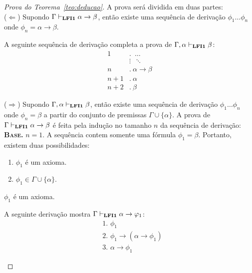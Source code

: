     \begin{proof}[Prova do Teorema~\ref{teo:deducao}] A prova será dividida em duas partes:\\
        ($\Longleftarrow$) Supondo $\Gamma \vdash_{{\normalfont\textbf{LFI1}}{}} \alpha \to \beta$, então existe uma sequência de derivação $\phi_{1} \ldots \phi_{n}$ onde $\phi_{n} = \alpha \to \beta$. 
        
        A seguinte sequência de derivação completa a prova de $\Gamma, \alpha \vdash_{{\normalfont\textbf{LFI1}}{}} \beta$:
        \begin{align*}
            \text{1}&.~ \; \ldots\\
            & \vdots \; ~\ddots\\
            \text{$n$}&.~ \alpha \to \beta\tag{Suposição}\\
            \text{$n + 1$}&.~ \alpha\tag{Premissa}\\
            \text{$n + 2$}&.~ \beta\tag{MP $n, n + 1$}
        \end{align*}

        \noindent  ($\Longrightarrow$) Supondo $\Gamma, \alpha \vdash_{{\normalfont\textbf{LFI1}}{}} \beta$, então existe uma sequência de derivação $\phi_{1} \ldots \phi_{n}$ onde $\phi_{n} = \beta$ a partir do conjunto de premissas $\Gamma \cup \{\alpha\}$. A prova de $\Gamma \vdash_{{\normalfont\textbf{LFI1}}{}} \alpha \to \beta$ é feita pela indução no tamanho $n$ da sequência de derivação:\\

        \noindent \textbf{\textsc{Base.}} $n = 1$.
        A sequência contem somente uma fórmula $\phi_{1} = \beta$. Portanto, existem duas possibilidades:
        \begin{enumerate}
            \item $\phi_{1}$ é um axioma.
            \item $\phi_{1} \in \Gamma \cup \{\alpha\}$.
        \end{enumerate}

        \begin{provaporcasos}
            \casodeprova{} $\phi_{1}$ é um axioma. 
            
                A seguinte derivação mostra $\Gamma \vdash_{{\normalfont\textbf{LFI1}}{}} \alpha \to \varphi_{1}$:
                \begin{align*}
                    & \text{1. } \phi_{1} \tag{Axioma}\\
                    & \text{2. } \phi_{1} \to (\alpha \to \phi_{1}) \tag{Ax1}\\
                    & \text{3. } \alpha \to \phi_{1} \tag{MP 1,2}
                \end{align*}


\end{provaporcasos}
\end{proof}
